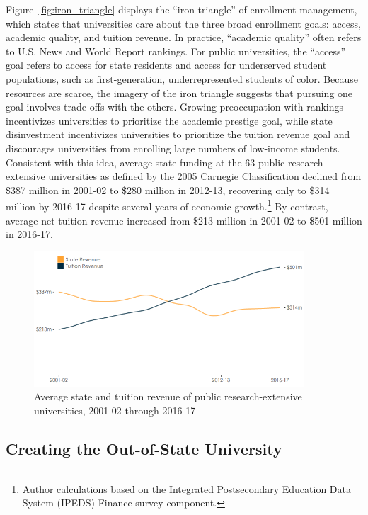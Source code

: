 \documentclass{article}
\begin{document}
Figure~\ref{fig:iron_triangle} displays the ``iron triangle'' of enrollment management, which states that universities care about the three broad enrollment goals: access, academic quality, and tuition revenue. In practice, ``academic quality'' often refers to U.S. News and World Report rankings. For public universities, the ``access'' goal refers to access for state residents and access for underserved student populations, such as first-generation, underrepresented students of color. Because resources are scarce, the imagery of the iron triangle suggests that pursuing one goal involves trade-offs with the others. Growing preoccupation with rankings incentivizes universities to prioritize the academic prestige goal, while state disinvestment incentivizes universities to prioritize the   tuition revenue goal and discourages universities from enrolling large numbers of low-income students. Consistent with this idea, average state funding at the 63 public research-extensive universities as defined by the 2005 Carnegie Classification declined from \$387 million in 2001-02 to \$280 million in 2012-13, recovering only to \$314 million by 2016-17 despite several years of economic growth.\footnote{Author calculations based on the Integrated Postsecondary Education Data System (IPEDS) Finance survey component.} By contrast, average net tuition revenue increased from \$213 million in 2001-02 to \$501 million in 2016-17.

\begin{figure}[!ht]
    \centering
    \includegraphics[width=0.9\textwidth]{assets/graphs/revenue_graph.png}
    \caption{Average state and tuition revenue of public research-extensive universities, 2001-02 through 2016-17}
    \label{fig:revenue_graph}
\end{figure}

\subsection*{Creating the Out-of-State University}
\end{document}

